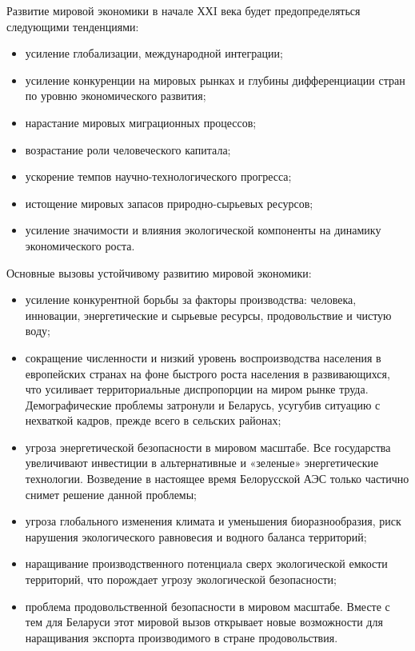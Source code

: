 \documentclass[14pt,a4paper]{article}
\begin{document}
    \par
    Развитие мировой экономики в начале ХХI века будет предопределяться следующими тенденциями:
    \begin{itemize}
        \item усиление глобализации, международной интеграции;
        \item усиление конкуренции на мировых рынках и глубины дифференциации стран по уровню экономического развития;
        \item нарастание мировых миграционных процессов;
        \item возрастание роли человеческого капитала;
        \item ускорение темпов научно-технологического прогресса;
        \item истощение мировых запасов природно-сырьевых ресурсов;
        \item усиление значимости и влияния экологической компоненты на динамику экономического роста.
    \end{itemize}
    Основные вызовы устойчивому развитию мировой экономики:
    \begin{itemize}
        \item усиление конкурентной борьбы за факторы производства: человека, инновации, энергетические и сырьевые ресурсы, продовольствие и чистую воду;
        \item сокращение численности и низкий уровень воспроизводства населения в европейских странах на фоне быстрого роста населения в развивающихся, что усиливает территориальные диспропорции на миром рынке труда. Демографические проблемы затронули и Беларусь, усугубив ситуацию с нехваткой кадров, прежде всего в сельских районах;
        \item угроза энергетической безопасности в мировом масштабе. Все государства увеличивают инвестиции в альтернативные и «зеленые» энергетические технологии. Возведение в настоящее время Белорусской АЭС только частично снимет решение данной проблемы;
        \item угроза глобального изменения климата и уменьшения биоразнообразия, риск нарушения экологического равновесия и водного баланса территорий;
        \item наращивание производственного потенциала сверх экологической емкости территорий, что порождает угрозу экологической безопасности;
        \item проблема продовольственной безопасности в мировом масштабе. Вместе с тем для Беларуси этот мировой вызов открывает новые возможности для наращивания экспорта производимого в стране продовольствия.
    \end{itemize}
\end{document}
